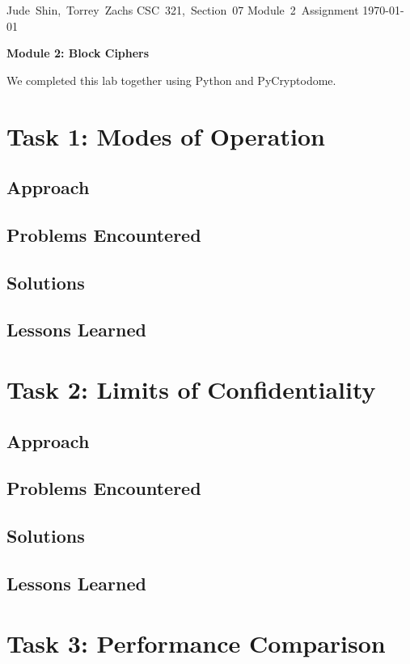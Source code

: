 \documentclass[11pt]{article}
\begin{document}
\hfill\vbox{\hbox{Jude Shin, Torrey Zachs}
		\hbox{CSC 321, Section 07}	
		\hbox{Module 2 Assignment}	
		\hbox{\today}}\par

\bigskip
\centerline{\Large\bf Module 2: Block Ciphers}\par
\bigskip

We completed this lab together using Python and PyCryptodome.

\section*{Task 1: Modes of Operation}
\subsection*{Approach}
\subsection*{Problems Encountered}
\subsection*{Solutions}
\subsection*{Lessons Learned}

\section*{Task 2: Limits of Confidentiality}
\subsection*{Approach}
\subsection*{Problems Encountered}
\subsection*{Solutions}
\subsection*{Lessons Learned}

\section*{Task 3: Performance Comparison}
\end{document}
